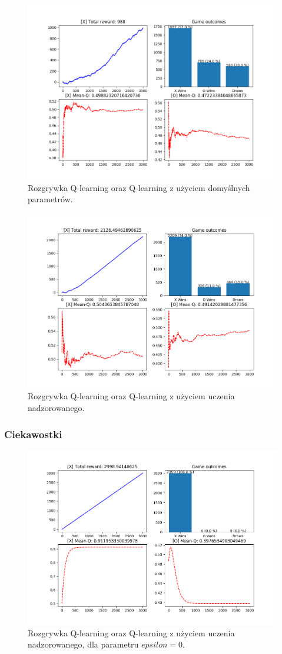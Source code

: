 \begin{figure}[H]
	\centering
	\includegraphics[width=0.7\linewidth]{imgs/q_learning/vs/q-q}
	\caption{Rozgrywka Q-learning oraz Q-learning z użyciem domyślnych parametrów.}
\end{figure}

\begin{figure}[H]
	\centering
	\includegraphics[width=0.7\linewidth]{imgs/q_learning/vs/q-q-supervised}
	\caption{Rozgrywka Q-learning oraz Q-learning z użyciem uczenia nadzorowanego.}
\end{figure}

\subsubsection{Ciekawostki}

\begin{figure}[H]
	\centering
	\includegraphics[width=0.7\linewidth]{imgs/q_learning/vs/q-q-miracle}
	\caption{Rozgrywka Q-learning oraz Q-learning z użyciem uczenia nadzorowanego, dla parametru $epsilon = 0$.}
\end{figure}

\pagebreak